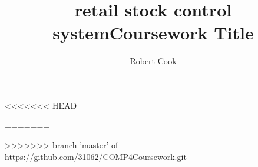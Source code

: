 \documentclass{report}
\begin{document}
<<<<<<< HEAD
\title{retail stock control system}
=======
\title{Coursework Title}
>>>>>>> branch 'master' of https://github.com/31062/COMP4Coursework.git
\author{Robert Cook}
\maketitle
\tableofcontents






\end{document}
